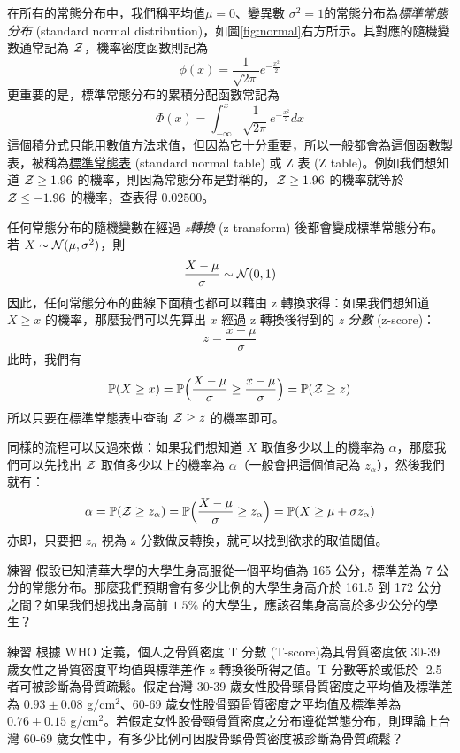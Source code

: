     在所有的常態分布中，我們稱平均值$\mu =0$、變異數 $\sigma^2 = 1$的常態分布為\textit{標準常態分布} (standard normal distribution)，如圖\ref{fig:normal}右方所示。其對應的隨機變數通常記為 $\mathcal{Z}$，機率密度函數則記為
    \[\phi(x)=\frac{1}{\sqrt{2\pi}}e^{-\frac{x^2}{2}}\]
    更重要的是，標準常態分布的累積分配函數常記為
    \[\Phi(x)=\int_{-\infty}^x \frac{1}{\sqrt{2\pi}}e^{-\frac{x^2}{2}} dx\]
    這個積分式只能用數值方法求值，但因為它十分重要，所以一般都會為這個函數製表，被稱為\href{https://en.wikipedia.org/wiki/Standard_normal_table}{標準常態表} (standard normal table) 或 Z 表 (Z table)。例如我們想知道 $\mathcal{Z} \ge 1.96$ 的機率，則因為常態分布是對稱的，$\mathcal{Z} \ge 1.96$ 的機率就等於 $\mathcal{Z} \le -1.96$ 的機率，查表得 $0.02500$。
    
    任何常態分布的隨機變數在經過 \textit{z轉換} (z-transform) 後都會變成標準常態分布。若 $X \sim \mathcal{N}(\mu, \sigma^2)$，則
    \[\frac{X-\mu}{\sigma} \sim \mathcal{N}(0,1)\]
    因此，任何常態分布的曲線下面積也都可以藉由 z 轉換求得：如果我們想知道 $X \ge x$ 的機率，那麼我們可以先算出 $x$ 經過 z 轉換後得到的 \textit{z 分數} (z-score)：
    \[z = \frac{x-\mu}{\sigma}\]
    此時，我們有
    \[\mathbb{P}(X \ge x) = \mathbb{P}\Big(\frac{X-\mu}{\sigma} \ge \frac{x-\mu}{\sigma}\Big) = \mathbb{P}(\mathcal{Z} \ge z)\]
    所以只要在標準常態表中查詢 $\mathcal{Z} \ge z$ 的機率即可。
    
    同樣的流程可以反過來做：如果我們想知道 $X$ 取值多少以上的機率為 $\alpha$，那麼我們可以先找出 $\mathcal{Z}$ 取值多少以上的機率為 $\alpha$（一般會把這個值記為 $z_\alpha$），然後我們就有：
    \[\alpha = \mathbb{P}(\mathcal{Z} \ge z_\alpha) = \mathbb{P}\Big(\frac{X-\mu}{\sigma} \ge z_\alpha \Big) = \mathbb{P}(X \ge \mu + \sigma z_\alpha)\]
    亦即，只要把 $z_\alpha$ 視為 z 分數做反轉換，就可以找到欲求的取值閾值。
    
    \bigskip

    \begin{custom}{練習}
        假設已知清華大學的大學生身高服從一個平均值為 165 公分，標準差為 7 公分的常態分布。那麼我們預期會有多少比例的大學生身高介於 161.5 到 172 公分之間？如果我們想找出身高前 $1.5\%$ 的大學生，應該召集身高高於多少公分的學生？
    \end{custom}

    \bigskip

    \begin{custom}{練習}
        根據 WHO 定義，個人之骨質密度 T 分數 (T-score)為其骨質密度依 30-39 歲女性之骨質密度平均值與標準差作 z 轉換後所得之值。T 分數等於或低於 -2.5 者可被診斷為骨質疏鬆。假定台灣 30-39 歲女性股骨頸骨質密度之平均值及標準差為 $0.93 \pm 0.08$ g/cm$^2$、60-69 歲女性股骨頸骨質密度之平均值及標準差為 $0.76 \pm 0.15$ g/cm$^2$。若假定女性股骨頸骨質密度之分布遵從常態分布，則理論上台灣 60-69 歲女性中，有多少比例可因股骨頸骨質密度被診斷為骨質疏鬆？
    \end{custom}

